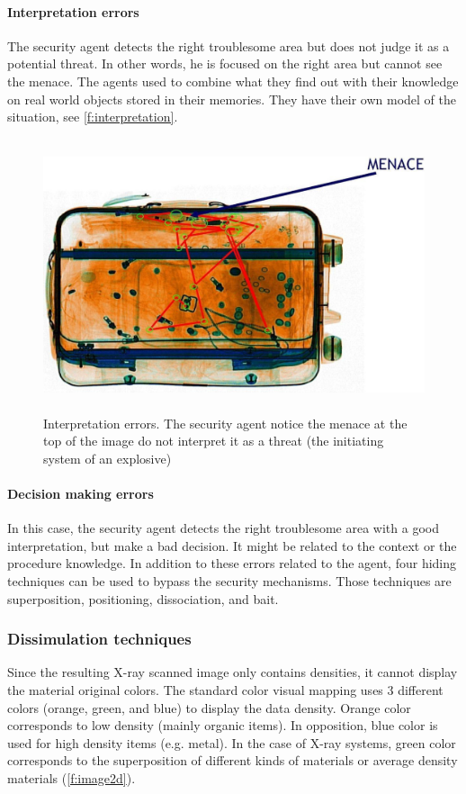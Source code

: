 \paragraph{Interpretation errors}

The security agent detects the right troublesome area but does not judge it as a potential threat. In other words, he is focused on the right area but cannot see the menace. The agents used to combine what they find out with their knowledge on real world objects stored in their memories. They have their own model of the situation, see  \autoref{f:interpretation}.
\begin{figure}
\centering
	\includegraphics[height=8cm]{Figures/interpretationError}
	\caption{Interpretation errors. The security agent notice the menace at the top of the image do not interpret it as a threat (the initiating system of an explosive)}
	\label{f:interpretation}
\end{figure}

\paragraph{Decision making errors}
In this case, the security agent detects the right troublesome area with a good interpretation, but make a bad decision. It might be related to the context or the procedure knowledge.
In addition to these errors related to the agent, four hiding techniques can be used to bypass the security mechanisms. Those techniques are superposition, positioning, dissociation, and bait.

\subsubsection{ Dissimulation techniques }
Since the resulting X-ray scanned image only contains densities, it cannot display the material original colors. The standard color visual mapping uses 3 different colors (orange, green, and blue) to display the data density. Orange color corresponds to low density (mainly organic items). In opposition, blue color is used for high density items (e.g. metal). In the case of X-ray systems, green color corresponds to the superposition of different kinds of materials or average density materials (\autoref{f:image2d}). 

